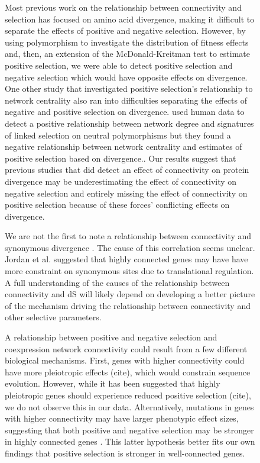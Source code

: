 \begin{figure}[ht!]
Most previous work on the relationship between connectivity and selection has focused on amino acid divergence, making it difficult to separate the effects of positive and negative selection. However, by using polymorphism to investigate the distribution of fitness effects and, then, an extension of the McDonald-Kreitman test to estimate positive selection, we were able to detect positive selection and negative selection which would have opposite effects on divergence. One other study that investigated positive selection’s relationship to network centrality also ran into difficulties separating the effects of negative and positive selection on divergence. \citep{Luisi2015-zz} used human data to detect a positive relationship between network degree and signatures of linked selection on neutral polymorphisms but they found a negative relationship between network centrality and estimates of positive selection based on divergence.. Our results suggest that previous studies that did detect an effect of connectivity on protein divergence may be underestimating the effect of connectivity on negative selection and entirely missing the effect of connectivity on positive selection because of these forces’ conflicting effects on divergence.

We are not the first to note a relationship between connectivity and synonymous divergence \citep{Jordan2004-vj}. The cause of this correlation seems unclear. Jordan et al. suggested that highly connected genes may have have more constraint on synonymous sites due to translational regulation. A full understanding of the causes of the relationship between connectivity and dS will likely depend on developing a better picture of the mechanism driving the relationship between connectivity and other selective parameters.

A relationship between positive and negative selection and coexpression network connectivity could result from a few different biological mechanisms. First, genes with higher connectivity could have more pleiotropic effects (cite), which would constrain sequence evolution. However, while it has been suggested that highly pleiotropic genes should experience reduced positive selection (cite), we do not observe this in our data. Alternatively, mutations in genes with higher connectivity may have larger phenotypic effect sizes, suggesting that both positive and negative selection may be stronger in highly connected genes \citep{Olson-Manning2012-ap}. This latter hypothesis better fits our own findings that positive selection is stronger in well-connected genes.


\end{figure}
